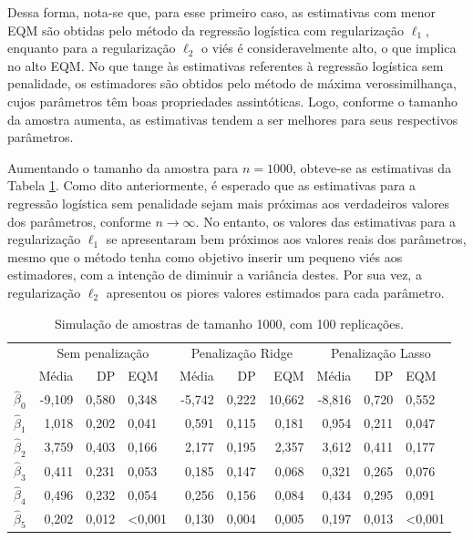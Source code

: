 \documentclass[
  12pt,
]{article}
\begin{document}
\quad Dessa forma, nota-se que, para esse primeiro caso, as estimativas
com menor EQM são obtidas pelo método da regressão logística com
regularização \(\ell_1\), enquanto para a regularização \(\ell_2\) o
viés é consideravelmente alto, o que implica no alto EQM. No que tange
às estimativas referentes à regressão logística sem penalidade, os
estimadores são obtidos pelo método de máxima verossimilhança, cujos
parâmetros têm boas propriedades assintóticas. Logo, conforme o tamanho
da amostra aumenta, as estimativas tendem a ser melhores para seus
respectivos parâmetros.

\quad Aumentando o tamanho da amostra para \(n = 1000\), obteve-se as
estimativas da Tabela \ref{tab:tabsim2}. Como dito anteriormente, é
esperado que as estimativas para a regressão logística sem penalidade
sejam mais próximas aos verdadeiros valores dos parâmetros, conforme
\(n \rightarrow \infty\). No entanto, os valores das estimativas para a
regularização \(\ell_1\) se apresentaram bem próximos aos valores reais
dos parâmetros, mesmo que o método tenha como objetivo inserir um
pequeno viés aos estimadores, com a intenção de diminuir a variância
destes. Por sua vez, a regularização \(\ell_2\) apresentou os piores
valores estimados para cada parâmetro.

\begin{table}[H]

\caption{\label{tab:tabsim2}Simulação de amostras de tamanho 1000, com 100 replicações.}
\centering
\fontsize{10}{12}\selectfont
\begin{tabular}[t]{lrrlrrrrrl}
\toprule
\multicolumn{1}{c}{ } & \multicolumn{3}{c}{Sem penalização} & \multicolumn{3}{c}{Penalização Ridge} & \multicolumn{3}{c}{Penalização Lasso} \\
\cmidrule(l{3pt}r{3pt}){2-4} \cmidrule(l{3pt}r{3pt}){5-7} \cmidrule(l{3pt}r{3pt}){8-10}
  & Média & DP & EQM & Média & DP & EQM & Média & DP & EQM\\
\midrule
$\hat{\beta}_0$ & -9,109 & 0,580 & 0,348 & -5,742 & 0,222 & 10,662 & -8,816 & 0,720 & 0,552\\
$\hat{\beta}_1$ & 1,018 & 0,202 & 0,041 & 0,591 & 0,115 & 0,181 & 0,954 & 0,211 & 0,047\\
$\hat{\beta}_2$ & 3,759 & 0,403 & 0,166 & 2,177 & 0,195 & 2,357 & 3,612 & 0,411 & 0,177\\
$\hat{\beta}_3$ & 0,411 & 0,231 & 0,053 & 0,185 & 0,147 & 0,068 & 0,321 & 0,265 & 0,076\\
$\hat{\beta}_4$ & 0,496 & 0,232 & 0,054 & 0,256 & 0,156 & 0,084 & 0,434 & 0,295 & 0,091\\
$\hat{\beta}_5$ & 0,202 & 0,012 & <0,001 & 0,130 & 0,004 & 0,005 & 0,197 & 0,013 & <0,001\\
\bottomrule
\end{tabular}
\end{table}
\end{document}
